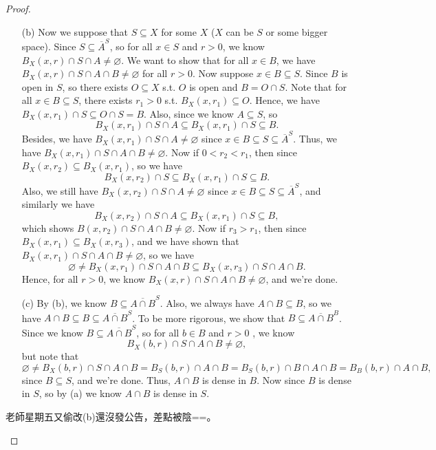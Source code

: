 \begin{proof}
\begin{itemize}
    \item [(b)] Now we suppose that \(S \subseteq X\) for some \(X\) (\(X\) can be \(S\) or some bigger space). Since \(S \subseteq \overline{A}^S \), so for all \(x \in S\) and \(r > 0\), we know \(B_X(x, r) \cap S \cap A \neq \varnothing \). We want to show that for all \(x \in B\), we have \(B_X(x, r) \cap S \cap A \cap B \neq \varnothing \) for all \(r > 0\). Now suppose \(x \in B \subseteq S\).  Since \(B\) is open in \(S\), so there exists \(O \subseteq X\) s.t. \(O\) is open and \(B = O \cap S\). Note that for all \(x \in B \subseteq S\), there exists \(r_1 > 0 \) s.t. \(B_X(x, r_1) \subseteq O\). Hence, we have \(B_X(x, r_1) \cap S \subseteq O \cap S = B\). Also, since we know \(A \subseteq S\), so 
    \[
      B_X(x, r_1) \cap S \cap A \subseteq B_X(x, r_1) \cap S \subseteq B.
    \]Besides, we have \(B_X(x, r_1) \cap S \cap A \neq \varnothing \) since \(x \in B \subseteq S \subseteq \overline{A}^S \). Thus, we have \(B_X(x, r_1) \cap S \cap A \cap B \neq \varnothing \). Now if \(0 < r_2 < r_1\), then since \(B_X(x, r_2) \subseteq B_X(x, r_1)\), so we have 
    \[
      B_X(x ,r_2) \cap S \subseteq B_X(x, r_1) \cap S \subseteq B.
    \] Also, we still have \(B_X(x, r_2) \cap S \cap A \neq \varnothing\) since \(x \in B \subseteq S \subseteq \overline{A}^S \), and similarly we have 
    \[
      B_X(x, r_2) \cap S \cap A \subseteq B_X(x, r_1) \cap S \subseteq B,
    \] which shows \(B(x, r_2) \cap S \cap A \cap B \neq \varnothing \). Now if \(r_3 > r_1\), then since \(B_X(x, r_1) \subseteq B_X(x, r_3)\), and we have shown that \(B_X(x, r_1) \cap S \cap A \cap B \neq \varnothing \), so we have 
    \[
      \varnothing \neq B_X(x, r_1) \cap S \cap A \cap B \subseteq B_X(x, r_3) \cap S \cap A \cap B.
    \]    Hence, for all \(r > 0\), we know \(B_X(x, r) \cap S \cap A \cap B \neq \varnothing \), and we're done.  
    \item [(c)] By (b), we know \(B \subseteq \overline{A \cap B}^S \). Also, we always have \(A \cap B \subseteq B\), so we have \(A \cap B \subseteq B \subseteq \overline{A \cap B}^S \). To be more rigorous, we show that \(B \subseteq \overline{A \cap B}^B \). Since we know \(B \subseteq \overline{A \cap B}^S \), so for all \(b \in B\) and \(r > 0\) , we know
    \[
      B_X(b, r) \cap S \cap A \cap B \neq \varnothing,
    \]
    but note that 
    \[
      \varnothing \neq B_X(b, r) \cap S \cap A \cap B = B_S(b, r) \cap A \cap B = B_S(b, r) \cap B \cap A \cap B = B_B(b, r) \cap A \cap B,
    \] since \(B \subseteq S\), and we're done.
    Thus, \(A \cap B\) is dense in \(B\). Now since \(B\) is dense in \(S\), so by (a) we know \(A \cap B\) is dense in \(S\).       
  \end{itemize}
  \begin{remark}
    老師星期五又偷改(b)還沒發公告，差點被陰==。 
  \end{remark}
\end{proof}